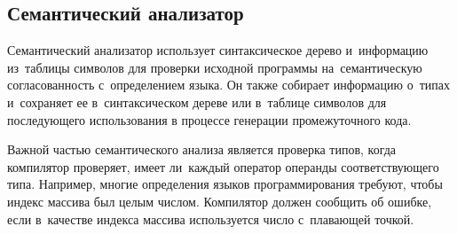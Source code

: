 \subsection{Семантический анализатор} \label{sub115}

Семантический анализатор использует синтаксическое дерево и~информацию из~таблицы символов для проверки исходной программы на~семантическую согласованность с~определением языка. Он также собирает информацию о~типах и~сохраняет ее в~синтаксическом дереве или в~таблице символов для последующего использования в процессе генерации промежуточного кода.

Важной частью семантического анализа является проверка типов, когда компилятор проверяет, имеет ли~каждый оператор операнды соответствующего типа. Например, многие определения языков программирования требуют, чтобы индекс массива был целым числом. Компилятор должен сообщить об ошибке, если в~качестве индекса массива используется число с~плавающей точкой.